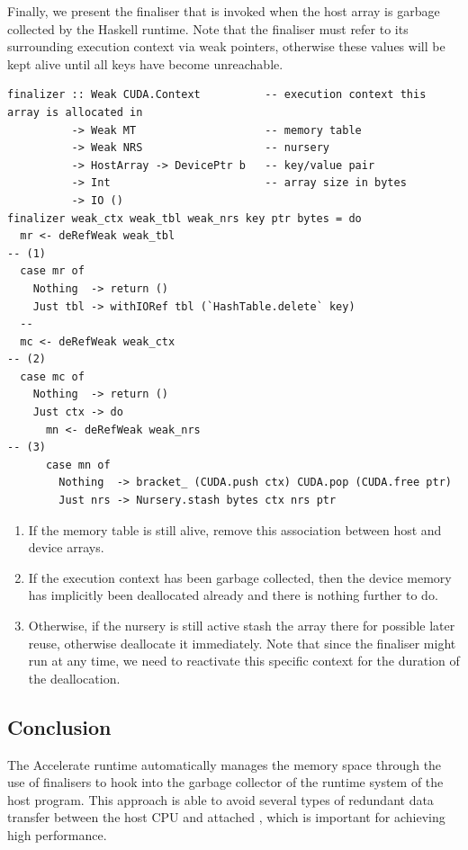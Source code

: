 Finally, we present the finaliser that is invoked when the host array is garbage
collected by the Haskell runtime. Note that the finaliser must refer to its
surrounding execution context via weak pointers, otherwise these values will be
kept alive until all keys have become unreachable.
%
\begin{lstlisting}[style=haskell]
finalizer :: Weak CUDA.Context          -- execution context this array is allocated in
          -> Weak MT                    -- memory table
          -> Weak NRS                   -- nursery
          -> HostArray -> DevicePtr b   -- key/value pair
          -> Int                        -- array size in bytes
          -> IO ()
finalizer weak_ctx weak_tbl weak_nrs key ptr bytes = do
  mr <- deRefWeak weak_tbl                                              -- (1)
  case mr of
    Nothing  -> return ()
    Just tbl -> withIORef tbl (`HashTable.delete` key)
  --
  mc <- deRefWeak weak_ctx                                              -- (2)
  case mc of
    Nothing  -> return ()
    Just ctx -> do
      mn <- deRefWeak weak_nrs                                          -- (3)
      case mn of
        Nothing  -> bracket_ (CUDA.push ctx) CUDA.pop (CUDA.free ptr)
        Just nrs -> Nursery.stash bytes ctx nrs ptr
\end{lstlisting}
%
\begin{enumerate}
\item If the memory table is still alive, remove this association between host
    and device arrays.

\item If the \CUDA execution context has been garbage collected, then the
    device memory has implicitly been deallocated already and there is nothing
    further to do.

\item Otherwise, if the nursery is still active stash the array there for
    possible later reuse, otherwise deallocate it immediately. Note that since
    the finaliser might run at any time, we need to reactivate this specific
    context for the duration of the deallocation.
\end{enumerate}


\subsection{Conclusion}
\label{sec:memory_management_conclusion}

The Accelerate runtime automatically manages the \CUDA memory space through the
use of finalisers to hook into the garbage collector of the runtime system of
the host program. This approach is able to avoid several types of redundant data
transfer between the host CPU and attached \GPU, which is important for
achieving high performance.

